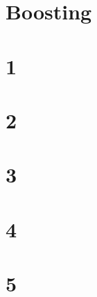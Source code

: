 \documentclass[11pt]{article}
\begin{document}
\section{}

\section{}

\section{}

\section*{Boosting}

\section*{1}

\section*{2}

\section*{3}

\section*{4}

\section*{5}
\end{document}
